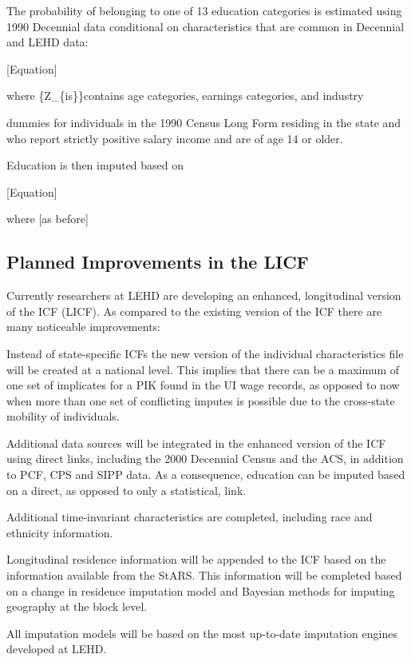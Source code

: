The probability of belonging to one of 13 education categories is estimated using 1990 Decennial data conditional on characteristics that are common in Decennial and LEHD data:





[Equation]





\noindent
where {\{}Z{\_}{\{}is{\}}{\}}contains age categories, earnings categories, and industry

\noindent
dummies for individuals in the 1990 Census Long Form residing in the state and who report strictly positive salary income and are of age 14 or older. 





Education is then imputed based on





[Equation]





\noindent
where [as before] 





\subsection{Planned Improvements in the LICF}





Currently researchers at LEHD are developing an enhanced, longitudinal version of the ICF (LICF). As compared to the existing version of the ICF there are many noticeable improvements: 

Instead of state-specific ICFs the new version of the individual characteristics file will be created at a national level. This implies that there can be a maximum of one set of implicates for a PIK found in the UI wage records, as opposed to now when more than one set of conflicting imputes is possible due to the cross-state mobility of individuals. 

Additional data sources will be integrated in the enhanced version of the ICF using direct links, including the 2000 Decennial Census and the ACS, in addition to PCF, CPS and SIPP data. As a consequence, education can be imputed based on a direct, as opposed to only a statistical, link.

Additional time-invariant characteristics are completed, including race and ethnicity information. 

Longitudinal residence information will be appended to the ICF based on the information available from the StARS. This information will be completed based on a change in residence imputation model and Bayesian methods for imputing geography at the block level. 

All imputation models will be based on the most up-to-date imputation engines developed at LEHD. 






